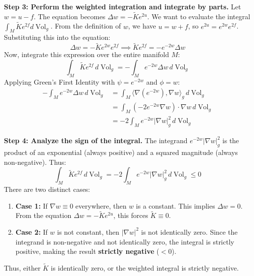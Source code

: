 \begin{solution}
\textbf{Step 3: Perform the weighted integration and integrate by parts.}
Let $w = u - f$. The equation becomes $\Delta w = -\widetilde{K}e^{2u}$. We want to evaluate the integral $\int_M \widetilde{K}e^{2f} d\operatorname{Vol}_g$. 
From the definition of $w$, we have $u = w + f$, so $e^{2u} = e^{2w}e^{2f}$. Substituting this into the equation:
\begin{equation*}
    \Delta w = -\widetilde{K} e^{2w} e^{2f} \implies \widetilde{K} e^{2f} = -e^{-2w} \Delta w
\end{equation*}
Now, integrate this expression over the entire manifold $M$:
\begin{equation*}
    \int_M \widetilde{K} e^{2f} \, d\operatorname{Vol}_g = -\int_M e^{-2w} \Delta w \, d\operatorname{Vol}_g
\end{equation*}
Applying Green's First Identity with $\psi = e^{-2w}$ and $\phi = w$:
\begin{align*}
    -\int_M e^{-2w} \Delta w \, d\operatorname{Vol}_g &= \int_M \langle \nabla(e^{-2w}), \nabla w \rangle_g \, d\operatorname{Vol}_g \\
    &= \int_M \left( -2e^{-2w} \nabla w \right) \cdot \nabla w \, d\operatorname{Vol}_g \\
    &= -2 \int_M e^{-2w} |\nabla w|^2_g \, d\operatorname{Vol}_g
\end{align*}

\textbf{Step 4: Analyze the sign of the integral.}
The integrand $e^{-2w} |\nabla w|^2_g$ is the product of an exponential (always positive) and a squared magnitude (always non-negative). Thus:
\begin{equation*}
    \int_M \widetilde{K} e^{2f} \, d\operatorname{Vol}_g = -2 \int_M e^{-2w} |\nabla w|^2_g \, d\operatorname{Vol}_g \leq 0
\end{equation*}
There are two distinct cases:
\begin{enumerate}
    \item \textbf{Case 1:} If $\nabla w \equiv 0$ everywhere, then $w$ is a constant. This implies $\Delta w = 0$. From the equation $\Delta w = -\widetilde{K}e^{2u}$, this forces $\widetilde{K} \equiv 0$.
    \item \textbf{Case 2:} If $w$ is not constant, then $|\nabla w|^2$ is not identically zero. Since the integrand is non-negative and not identically zero, the integral is strictly positive, making the result \textbf{strictly negative} ($< 0$).
\end{enumerate}
Thus, either $\widetilde{K}$ is identically zero, or the weighted integral is strictly negative.


\end{solution}
